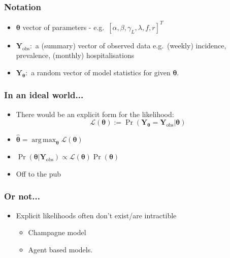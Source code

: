 \documentclass{beamer}
\DeclareMathOperator*{\argmax}{arg\,max}
\begin{document}
\begin{frame}
    \frametitle{Notation}
    \begin{itemize}
        \item $\bm{\theta}$ vector of parameters
              - e.g.\ $[\alpha, \beta, \gamma_L, \lambda, f, r]^T$
        \item $\mathbf{Y}_\text{obs}:$ a (summary) vector of observed data
              e.g.\ (weekly) incidence, prevalence, (monthly) hospitalisations
        \item <2->$\mathbf{Y}_{\bm{\theta}}:$ a random vector
              of model statistics for given $\bm{\theta}.$
    \end{itemize}
\end{frame}

\begin{frame}
    \frametitle{In an ideal world...}
    \begin{itemize}
        \item There would be an explicit form for the likelihood:
              $$
                  \mathcal{L}(\bm{\theta})
                  := \Pr(
                  \mathbf{Y}_{\bm{\theta}} = \mathbf{Y}_\text{obs}
                  | \bm{\theta}
                  )
              $$
        \item $\hat{\bm{\theta}}
                  = \argmax_{\bm{\theta}} \mathcal{L}(\bm{\theta})$
        \item $\Pr(\bm{\theta}|\mathbf{Y}_\text{obs})
                  \propto \mathcal{L}(\bm{\theta})\Pr(\bm{\theta})$
        \item Off to the pub
    \end{itemize}
\end{frame}

\begin{frame}
    \frametitle{Or not...}
    \begin{itemize}
        \item Explicit likelihoods often don't exist/are intractible
              \begin{itemize}
                  \item Champagne model
                  \item Agent based models.
              \end{itemize}
    \end{itemize}
\end{frame}
\end{document}
